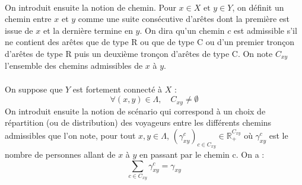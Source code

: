 \documentclass[12pt]{article}
\newcommand{\R}{\mathbb{R}}
\begin{document}
\\
On introduit ensuite la notion de chemin. Pour $x \in X \text{ et } y \in Y$, on définit un chemin entre $x$ et $y$ comme une suite consécutive d'arêtes dont la première est issue de $x$ et la dernière termine en $y$. On dira qu'un chemin $c$ est admissible s'il ne contient des arêtes que de type R ou que de type C ou d'un premier tronçon d'arêtes de type R puis un deuxième tronçon d'arêtes de type C. On note $C_{xy}$ l'ensemble des chemins admissibles de $x$ à $y$.\\
\\
On suppose que $Y$ est fortement connecté à $X$ :
\[
\forall (x,y) \in \Lambda,\quad C_{xy} \neq \emptyset
\]
On introduit ensuite la notion de scénario qui correspond à un choix de répartition (ou de distribution) des voyageurs entre les différents chemins admissibles que l'on note, pour tout $x,y \in \Lambda$, $(\gamma_{xy}^c)_{c \in C_{xy}} \in \R^{C_{xy}}_+$ où $\gamma_{xy}^c$ est le nombre de personnes allant de $x$ à $y$ en passant par le chemin c. On a : \[
\sum_{c \in C_{xy}} \gamma_{xy}^c = \gamma_{xy}
\]\\
\\
\end{document}

